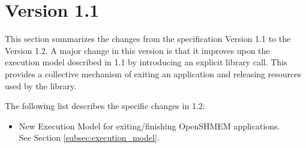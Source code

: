 \section{Version 1.1}
This section summarizes the changes from the \openshmem specification Version 1.1 to the Version 1.2.  
A major change in this version is that it improves upon the execution model described in 1.1 by introducing an explicit  library call. This provides a collective mechanism of exiting an \openshmem application and releasing resources used by the library.  



The following list describes the specific changes in 1.2:
\begin{itemize}
\item New Execution Model for exiting/finishing OpenSHMEM applications.\\See Section  \ref{subsec:execution_model}.

\end{itemize}
